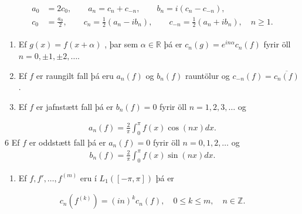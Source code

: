 \documentclass[a4paper,10pt,icelandic]{sphinxmanual}
\begin{document}
\begin{equation*}
\begin{split}\begin {align*}
a_0 &= 2c_0, \qquad a_n = c_n + c_{-n}, \qquad b_n = i(c_n-c_{-n}),  \\
c_0 &= \frac{a_0}{2}, \qquad c_n = \frac{1}{2}(a_n-ib_n), \qquad c_{-n} = \frac{1}{2}(a_n+ib_n), \quad n\geq 1.
\end {align*}\end{split}
\end{equation*}\begin{enumerate}
\def\theenumi{\arabic{enumi}}
\def\labelenumi{\theenumi .}
\makeatletter\def\p@enumii{\p@enumi \theenumi .}\makeatother
\setcounter{enumi}{2}
\item {} 
Ef \(g(x) = f(x+\alpha)\) , þar sem \(\alpha \in \mathbb{R}\) þá er \(c_n(g) = e^{i n\alpha} c_n(f)\) fyrir öll \(n=0,\pm 1,\pm2,\ldots\).

\item {} 
Ef \(f\) er raungilt fall þá eru \(a_n(f)\) og \(b_n(f)\) rauntölur og \(c_{-n}(f) = \overline{c_n(f)}\).

\item {} 
Ef \(f\) er jafnstætt fall þá er \(b_n(f) = 0\) fyrir öll \(n=1,2,3,\ldots\) og

\end{enumerate}
\begin{equation*}
\begin{split}a_n(f) = \frac{2}{\pi} \int_0^\pi f(x) \cos(nx) dx.\end{split}
\end{equation*}
6 Ef \(f\) er oddstætt fall þá er \(a_n(f) = 0\) fyrir öll \(n=0,1,2,\ldots\) og
\begin{equation*}
\begin{split}b_n(f) = \frac{2}{\pi} \int_0^\pi f(x) \sin(nx) dx.\end{split}
\end{equation*}\begin{enumerate}
\def\theenumi{\arabic{enumi}}
\def\labelenumi{\theenumi .}
\makeatletter\def\p@enumii{\p@enumi \theenumi .}\makeatother
\setcounter{enumi}{6}
\item {} 
Ef \(f,f',\ldots,f^{(m)}\) eru í \(L_1([-\pi,\pi])\) þá er

\end{enumerate}
\begin{equation*}
\begin{split}c_n(f^{(k)}) = (in)^k c_n(f), \quad 0\leq k \leq m, \quad n \in \mathbb{Z}.\end{split}
\end{equation*}
\end{document}
